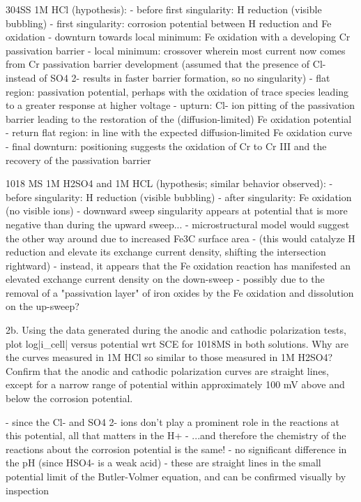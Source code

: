 	304SS 1M HCl (hypothesis):
	- before first singularity: H reduction (visible bubbling)
	- first singularity: corrosion potential between H reduction and Fe oxidation
	- downturn towards local minimum: Fe oxidation with a developing Cr passivation barrier
	- local minimum: crossover wherein most current now comes from Cr passivation barrier development
		(assumed that the presence of Cl- instead of SO4 2- results in faster barrier formation, so no singularity)
	- flat region: passivation potential, perhaps with the oxidation of trace species leading to a greater response at higher voltage
	- upturn: Cl- ion pitting of the passivation barrier leading to the restoration of the (diffusion-limited) Fe oxidation potential
	- return flat region: in line with the expected diffusion-limited Fe oxidation curve
	- final downturn: positioning suggests the oxidation of Cr to Cr III and the recovery of the passivation barrier

	1018 MS 1M H2SO4 and 1M HCL (hypothesis; similar behavior observed):
	- before singularity: H reduction (visible bubbling)
	- after singularity: Fe oxidation (no visible ions)
	- downward sweep singularity appears at potential that is more negative than during the upward sweep...
		- microstructural model would suggest the other way around due to increased Fe3C surface area
		- (this would catalyze H reduction and elevate its exchange current density, shifting the intersection rightward)
		- instead, it appears that the Fe oxidation reaction has manifested an elevated exchange current density on the down-sweep
		- possibly due to the removal of a "passivation layer" of iron oxides by the Fe oxidation and dissolution on the up-sweep?

2b. Using the data generated during the anodic and cathodic polarization tests, plot log|i_cell| versus potential wrt SCE for 1018MS in both solutions.  Why are the curves measured in 1M HCl so similar to those measured in 1M H2SO4?  Confirm that the anodic and cathodic polarization curves are straight lines, except for a narrow range of potential within approximately 100 mV above and below the corrosion potential.
	
	- since the Cl- and SO4 2- ions don't play a prominent role in the reactions at this potential, all that matters in the H+
	- ...and therefore the chemistry of the reactions about the corrosion potential is the same!
	- no significant difference in the pH (since HSO4- is a weak acid)
	- these are straight lines in the small potential limit of the Butler-Volmer equation, and can be confirmed visually by inspection

